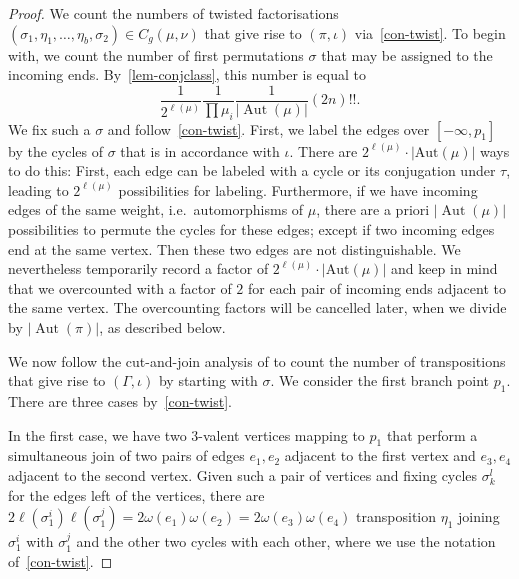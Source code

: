 \documentclass[10pt]{amsart}
\theoremstyle{plain}
\theoremstyle{definition}
\theoremstyle{definition}
\theoremstyle{plain}
\theoremstyle{plain}
\theoremstyle{remark}
\theoremstyle{plain}
\theoremstyle{plain}
\DeclareMathOperator{\Aut}{Aut}
\begin{document}
\begin{proof}
We count the numbers of twisted factorisations $(\sigma_1,\eta_1,\dots,\eta_b,\sigma_2)\in C_g(\mu,\nu)$ that give rise to $(\pi,\iota)$ via~\cref{con-twist}. To begin with, we count the number of first permutations $\sigma$ that may be assigned to the incoming ends. By~\cref{lem-conjclass}, this number is equal to
\begin{equation*}
    \frac{1}{2^{\ell(\mu)}} \frac{1}{\prod \mu_i} \frac{1}{|\Aut(\mu)|}(2n)!! .
\end{equation*}
We fix such a $\sigma$  and follow~\cref{con-twist}. First, we label the edges over $[-\infty,p_1]$ by the cycles of $\sigma$ that is in accordance with $\iota$. There are $2^{\ell(\mu)}\cdot |\mathrm{Aut}(\mu)|$ ways to do this: 
First, each edge can be labeled with a cycle or its conjugation under $\tau$, leading to $2^{\ell(\mu)}$ possibilities for labeling.
Furthermore, if we have incoming edges of the same weight, i.e.\ automorphisms of $\mu$, there are a priori $|\Aut(\mu)|$ possibilities to permute the cycles for these edges; except if two incoming edges end at the same vertex. Then these two edges are not distinguishable. We nevertheless temporarily record a factor of $2^{\ell(\mu)}\cdot |\mathrm{Aut}(\mu)|$ and keep in mind that we overcounted with a factor of $2$ for each pair  of incoming ends adjacent to the same vertex. The overcounting factors will be cancelled later, when we divide by $|\Aut(\pi)|$, as described below.

We now follow the cut-and-join analysis of \cite[Theorem 2.12]{BF21} to count the number of transpositions that give rise to $(\Gamma,\iota)$ by starting with $\sigma$. We consider the first branch point $p_1$. There are three cases by~\cref{con-twist}.

In the first case, we have two $3$-valent vertices mapping to $p_1$ that perform a simultaneous join of two pairs of edges $e_1,e_2$ adjacent to the first vertex and $e_3,e_4$ adjacent to the second vertex. Given such a pair of vertices and fixing cycles $\sigma_k^l$ for the edges left of the vertices, there are $2\ell(\sigma_1^i)\ell(\sigma_1^j)=2\omega(e_1)\omega(e_2)= 2\omega(e_3)\omega(e_4)$ transposition $\eta_1$ joining $\sigma_1^i$ with $\sigma_1^j$ and the other two cycles with each other, where we use the notation of~\cref{con-twist}.


\end{proof}
\end{document}
